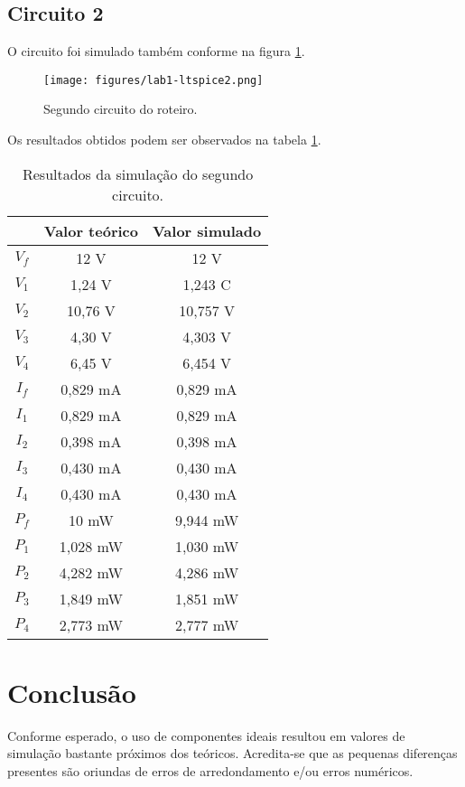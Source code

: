 \documentclass[a4paper]{report}
\begin{document}
\subsection*{Circuito 2}

O circuito foi simulado também conforme na figura \ref{fig:figures-lab1-ltspice2-png}.

\begin{figure}[H]
    \centering
    \texttt{[image: figures/lab1-ltspice2.png]}
    \caption{Segundo circuito do roteiro.}
    \label{fig:figures-lab1-ltspice2-png}
\end{figure}

Os resultados obtidos podem ser observados na tabela \ref{tab:circ-2}.

\begin{table}[H]
    \centering
    \caption{Resultados da simulação do segundo circuito.}
    \label{tab:circ-2}
    \begin{tabular}{c | c | c}
     & Valor teórico & Valor simulado \\
     \hline
	$V_f$ & 12 V & 12 V \\
	$V_1$ & 1,24 V & 1,243 C \\
	$V_2$ & 10,76 V & 10,757 V \\
	$V_3$ & 4,30 V & 4,303 V \\
	$V_4$ & 6,45 V & 6,454 V \\
	$I_f$ & 0,829 mA & 0,829 mA \\
	$I_1$ & 0,829 mA & 0,829 mA \\
	$I_2$ & 0,398 mA & 0,398 mA \\
	$I_3$ & 0,430 mA & 0,430 mA \\
	$I_4$ & 0,430 mA & 0,430 mA \\
	$P_f$ & 10 mW & 9,944 mW \\
	$P_1$ & 1,028 mW & 1,030 mW \\
	$P_2$ & 4,282 mW & 4,286 mW \\
	$P_3$ & 1,849 mW & 1,851 mW \\
	$P_4$ & 2,773 mW & 2,777 mW \\
    \end{tabular}
\end{table}

\section*{Conclusão}

Conforme esperado, o uso de componentes ideais resultou em valores de simulação bastante próximos dos teóricos. Acredita-se que as pequenas diferenças presentes são oriundas de erros de arredondamento e/ou erros numéricos.
\end{document}
